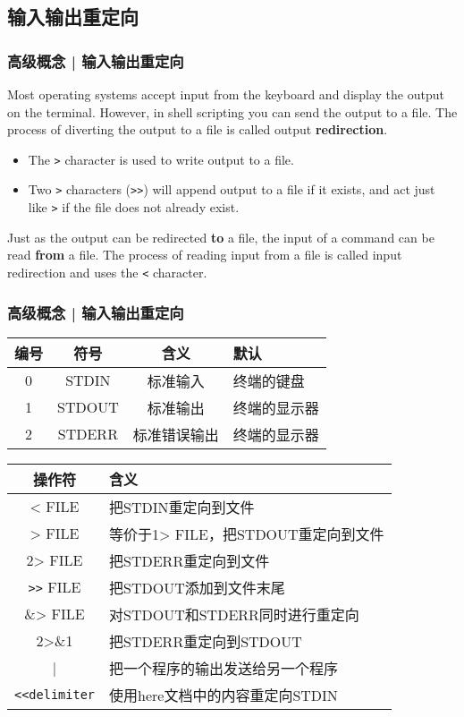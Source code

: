 \subsection{输入输出重定向}
\begin{frame}[fragile]
  \frametitle{高级概念 | 输入输出重定向}
  Most operating systems accept input from the keyboard and display the output on the terminal. However, in shell scripting you can send the output to a file. The process of diverting the output to a file is called output \textbf{redirection}.
  \begin{itemize}
    \item The \verb|>| character is used to write output to a file.
    \item Two \verb|>| characters (\verb|>>|) will append output to a file if it exists, and act just like \verb|>| if the file does not already exist.
  \end{itemize}
  Just as the output can be redirected \textbf{to} a file, the input of a command can be read \textbf{from} a file. The process of reading input from a file is called input redirection and uses the \verb|<| character.
\end{frame}

\begin{frame}[fragile]
  \frametitle{高级概念 | \alert{输入输出重定向}}
  \begin{table}
    \centering
    \begin{tabularx}{0.8\textwidth}{cccX}
      \hline
      \rowcolor{blue!50}编号 & 符号 & 含义 & 默认\\
      \hline
      0 & STDIN & 标准输入 & 终端的键盘\\
      1 & STDOUT & 标准输出 & 终端的显示器\\
      2 & STDERR & 标准错误输出 & 终端的显示器\\
      \hline
    \end{tabularx}
  \end{table}
  \pause
  \begin{table}
    \centering
    \begin{tabularx}{0.9\textwidth}{cX}
      \hline
      \rowcolor{blue!50}操作符 & 含义\\
      \hline
      < FILE & 把STDIN重定向到文件\\
      > FILE & 等价于1> FILE，把STDOUT重定向到文件\\
      2> FILE & 把STDERR重定向到文件\\
      \verb|>>| FILE & 把STDOUT添加到文件末尾\\
      \&> FILE & 对STDOUT和STDERR同时进行重定向\\
      2>\&1 & 把STDERR重定向到STDOUT\\
      | & 把一个程序的输出发送给另一个程序\\
      \verb|<<delimiter| & 使用here文档中的内容重定向STDIN\\
      \hline
    \end{tabularx}
  \end{table}
\end{frame}

